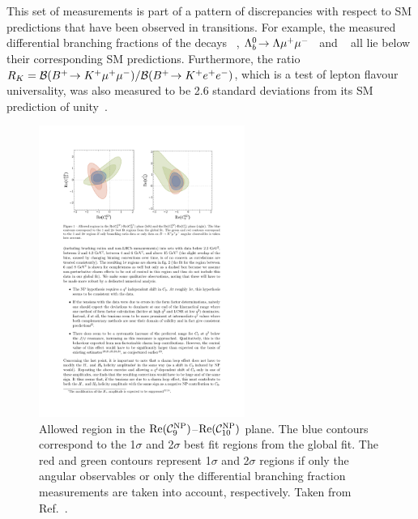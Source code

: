 This set of measurements is part of a pattern of discrepancies with respect to SM predictions that have been observed in \btosmm transitions. For example, the measured differential branching fractions of the decays \BsTophimm~\cite{LHCB-PAPER-2015-023}, ${{\Lambda}^0_{b}}\!\rightarrow \Lambda{\ensuremath{\mu^+\mu^-}}$~\cite{LHCB-PAPER-2015-009} and \BuToKmm~\cite{LHCB-PAPER-2014-006} all lie below their corresponding SM predictions. Furthermore, the ratio $R_{K} = {\mathcal{B}}({{{B}^+}}\!\rightarrow {\ensuremath{{K}^+}}{\ensuremath{\mu^+}}{\ensuremath{\mu^-}})/{\mathcal{B}}({{{B}^+}}\!\rightarrow {\ensuremath{{K}^+}}{\ensuremath{e^+}}{\ensuremath{e^-}})$, which is a test of lepton flavour universality, was also measured to be 2.6 standard deviations from its SM prediction of unity~\cite{LHCB-PAPER-2014-024}.

\begin{figure}[!tb]
\centering
\includegraphics[trim={2.5cm 20cm 10.7cm 2.4cm},clip,width=0.6\textwidth]{figs/kpimm/introduction/c9c10.pdf}
\caption{Allowed region in the ${\rm Re}(\mathcal{C}_{9}^{\rm NP})$--${\rm Re}(\mathcal{C}_{10}^{\rm NP})$ plane. The blue contours correspond to the 1$\sigma$ and 2$\sigma$ best fit regions from the global fit. The red and green contours represent 1$\sigma$ and 2$\sigma$ regions if only the \BdToKstmmP angular observables or only the differential branching fraction measurements are taken into account, respectively. Taken from Ref.~\cite{Altmannshofer:2015sma}.}
\label{fig:kpimm:c9c10}
\end{figure}

